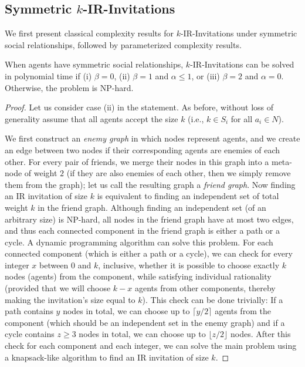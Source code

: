 \subsection{Symmetric $k$-IR-Invitations}

We first present classical complexity results for $k$-IR-Invitations under symmetric social relationships, followed by parameterized complexity results. 


\begin{theorem} \label{SIP:thm:symmetric_IR_p_npc}
	When agents have symmetric social relationships, 
	$k$-IR-Invitations can be solved in polynomial time if (i) $\beta = 0$, (ii) $\beta = 1$ and $\alpha \leq 1$, or (iii) $\beta = 2$ and $\alpha = 0$. Otherwise, the problem is NP-hard. 
\end{theorem}
\begin{proof}
	Let us consider case (ii) in the statement. 
	As before, without loss of generality assume that all agents accept the size $k$ (i.e., $k\in S_i$ for all $a_i\in N$). 
	
	We first construct an {\em enemy graph} in which nodes represent agents, and we create an edge between two nodes if their corresponding agents are enemies of each other. For every pair of friends, we merge their nodes in this graph into a meta-node of weight $2$ (if they are also enemies of each other, then we simply remove them from the graph); let us call the resulting graph a {\em friend graph}. 
	Now finding an IR invitation of size $k$ is equivalent to finding an independent set of total weight $k$ in the friend graph. Although finding an independent set (of an arbitrary size) is NP-hard, all nodes in the friend graph have at most two edges, and thus each connected component in the friend graph is either a path or a cycle. 
	A dynamic programming algorithm can solve this problem.
	For each connected component (which is either a path or a cycle), we can check for every integer $x$ between $0$ and $k$, inclusive, whether it is possible to choose exactly $k$ nodes (agents) from the component, while satisfying individual rationality (provided that we will choose $k-x$ agents from other components, thereby making the invitation's size equal to $k$). This check can be done trivially: If a path contains $y$ nodes in total, we can choose up to $\lceil y/2 \rceil$ agents from the component (which should be an independent set in the enemy graph) and if a cycle contains $z \geq 3$ nodes in total, we can choose up to $\lfloor z/2 \rfloor$ nodes. After this check for each component and each integer, we can solve the main problem using a knapsack-like algorithm to find an IR invitation of size $k$.


\end{proof}
